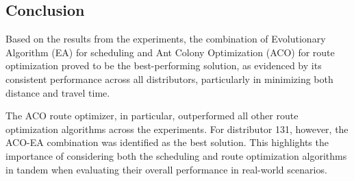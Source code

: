 \subsection{Conclusion}
Based on the results from the experiments, the combination of Evolutionary Algorithm (EA) for scheduling and Ant Colony Optimization (ACO) for route optimization proved to be the best-performing solution, as evidenced by its consistent performance across all distributors, particularly in minimizing both distance and travel time.

The ACO route optimizer, in particular, outperformed all other route optimization algorithms across the experiments. For distributor 131, however, the ACO-EA combination was identified as the best solution. This highlights the importance of considering both the scheduling and route optimization algorithms in tandem when evaluating their overall performance in real-world scenarios.

